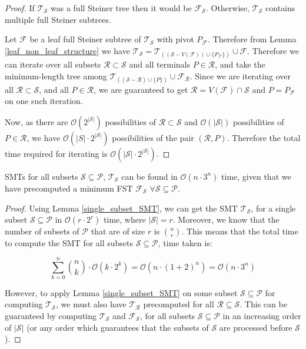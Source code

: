 \begin{proof}

If $\mathcal T_{\mathcal S}$ was a full Steiner tree then it would be $\mathcal F_{\mathcal S}$. Otherwise, $\mathcal T_{\mathcal S}$ contains multiple full Steiner subtrees.

Let $\mathcal F$ be a leaf full Steiner subtree of $\mathcal T_{\mathcal{S}}$ with pivot $P_{\mathcal F}$. Therefore from Lemma \ref{leaf_non_leaf_structure} we have $\mathcal T_{\mathcal S} = \mathcal T_{((\mathcal S - V(\mathcal F)) \cup \{P_{\mathcal F}\})} \cup \mathcal F$. Therefore we can iterate over all subsets $\mathcal R \subset \mathcal S$ and all terminals $P \in \mathcal{R}$, and take the minimum-length tree among $\mathcal T_{((\mathcal S - \mathcal R)  \cup \{P\})} \cup \mathcal F_{\mathcal R}$. Since we are iterating over all $\mathcal R \subset \mathcal S$, and all $P \in \mathcal R$, we are guaranteed to get $\mathcal R = V(\mathcal F) \cap \mathcal{S}$ and $P = P_{\mathcal F}$ on one such iteration.

Now, as there are $\mathcal O(2^{|\mathcal S|})$ possibilities of $\mathcal R \subset \mathcal S$ and $\mathcal O(|\mathcal S|)$ possibilities of $P \in \mathcal R$, we have $\mathcal O(|S| \cdot 2^{|\mathcal S|})$ possibilities of the pair $(\mathcal R, P)$. Therefore the total time required for iterating is $\mathcal O(|{\mathcal S}| \cdot 2^{|{\mathcal S}|})$.

\end{proof}

\begin{lemma}
\label{multi_subset_SMT}
SMTs for all subsets $\mathcal S \subseteq \mathcal P$, $\mathcal T_{\mathcal S}$ can be found in $\mathcal O(n \cdot 3 ^n)$ time, given that we have precomputed a minimum FST $\mathcal F_{\mathcal S}$ $\forall \mathcal S \subseteq \mathcal P$.
\end{lemma}

\begin{proof}

Using Lemma \ref{single_subset_SMT}, we can get the SMT $\mathcal T_{\mathcal S}$, for a single subset $\mathcal S \subseteq \mathcal P$ in $\mathcal O(r \cdot 2^r)$ time, where $|{\mathcal S}| = r$. Moreover, we know that the number of subsets of $\mathcal P$ that are of size $r$ is $\binom n r$. This means that the total time to compute the SMT for all subsets $\mathcal S \subseteq \mathcal P$, time taken is: 

$$\sum \limits_{k = 0} ^ {n} \binom{n}{k} \cdot \mathcal O(k \cdot 2^k) = \mathcal O(n \cdot (1 + 2)^n) = \mathcal O(n \cdot 3^n)$$

However, to apply Lemma \ref{single_subset_SMT} on some subset $\mathcal S \subseteq \mathcal P$ for computing $\mathcal T_{\mathcal S}$, we must also have $\mathcal T_{\mathcal R}$ precomputed for all $\mathcal R \subseteq \mathcal S$. This can be guaranteed by computing $\mathcal T_{\mathcal S}$ and $\mathcal{F}_{\mathcal{S}}$, for all subsets $\mathcal S \subseteq \mathcal P$ in an increasing order of $|\mathcal S|$ (or any order which guarantees that the subsets of $\mathcal S$ are processed before $\mathcal S$).

\end{proof}

